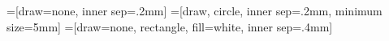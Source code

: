 \usepackage{tikz}
\usepackage{pgffor}

=[draw=none, inner sep=.2mm]
=[draw, circle, inner sep=.2mm, minimum size=5mm]
=[draw=none, rectangle, fill=white, inner sep=.4mm]

\newenvironment{mypic}{
  \begin{center}
  \begin{tikzpicture}
}{
  \end{tikzpicture}
  \end{center}
}


\usepackage{booktabs}
\usepackage[color=red!5]{todonotes}
\usepackage{url}
\usepackage{booktabs}

\usepackage{minted}


\DeclareMathOperator{\SUM}{SUM}
\DeclareMathOperator{\MOD}{MOD}
\DeclareMathOperator{\size}{size}
\DeclareMathOperator{\gates}{gates}
\DeclareMathOperator{\IN}{IN}
\DeclareMathOperator{\MID}{MID}
\DeclareMathOperator{\OUT}{OUT}


